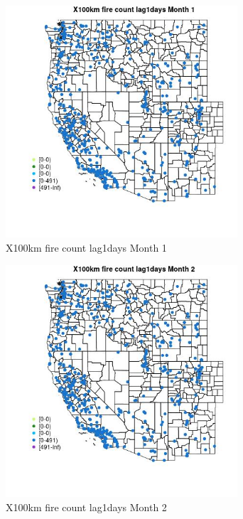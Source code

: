 \begin{figure} 
\centering  
\includegraphics[width=0.77\textwidth]{Code_Outputs/Report_ML_input_PM25_Step4_part_e_de_duplicated_aves_compiled_2019-05-14wNAs_MapObsMo1X100km_fire_count_lag1days.jpg} 
\caption{\label{fig:Report_ML_input_PM25_Step4_part_e_de_duplicated_aves_compiled_2019-05-14wNAsMapObsMo1X100km_fire_count_lag1days}X100km fire count lag1days Month 1} 
\end{figure} 
 

\begin{figure} 
\centering  
\includegraphics[width=0.77\textwidth]{Code_Outputs/Report_ML_input_PM25_Step4_part_e_de_duplicated_aves_compiled_2019-05-14wNAs_MapObsMo2X100km_fire_count_lag1days.jpg} 
\caption{\label{fig:Report_ML_input_PM25_Step4_part_e_de_duplicated_aves_compiled_2019-05-14wNAsMapObsMo2X100km_fire_count_lag1days}X100km fire count lag1days Month 2} 
\end{figure} 
 


